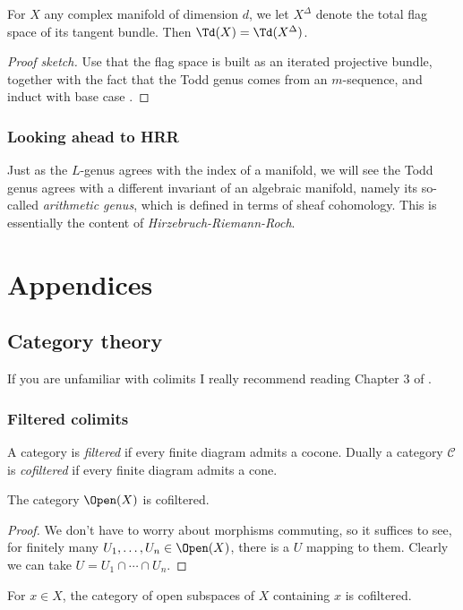\documentclass[11pt]{book}
\begin{document}
\begin{corollary} For $X$ any complex manifold of dimension $d$, we let $X^\Delta$ denote the total flag space of its tangent bundle. Then $\Td(X) = \Td(X^\Delta)$. 
\end{corollary}
\begin{proof}[Proof sketch] Use that the flag space is built as an iterated projective bundle, together with the fact that the Todd genus comes from an $m$-sequence, and induct with base case .
\end{proof}



\subsection{Looking ahead to HRR}

Just as the $L$-genus agrees with the index of a manifold, we will see the Todd genus agrees with a different invariant of an algebraic manifold, namely its so-called \emph{arithmetic genus}, which is defined in terms of sheaf cohomology. This is essentially the content of \emph{Hirzebruch-Riemann-Roch}.







\newpage
\appendix
\chapter{Appendices}
\minitoc
\section{Category theory}
If you are unfamiliar with colimits I really recommend reading Chapter 3 of \cite{riehlCategoryTheoryContext2016}.

\subsection{Filtered colimits}

\begin{definition} A category is \emph{filtered} if every finite diagram admits a cocone. Dually a category $\mathscr{C}$ is \emph{cofiltered} if every finite diagram admits a cone.
\end{definition}

\begin{example}\label{exa:OpenX-filtered} The category $\Open(X)$ is cofiltered.
\end{example}
\begin{proof} We don't have to worry about morphisms commuting, so it suffices to see, for finitely many $U_1, \ldots, U_n\in \Open(X)$, there is a $U$ mapping to them. Clearly we can take $U = U_1\cap \cdots \cap U_n$.
\end{proof}
\begin{example}\label{exa:OpenX-containing-x-filtered} For $x\in X$, the category of open subspaces of $X$ containing $x$ is cofiltered.
\end{example}
\end{document}
